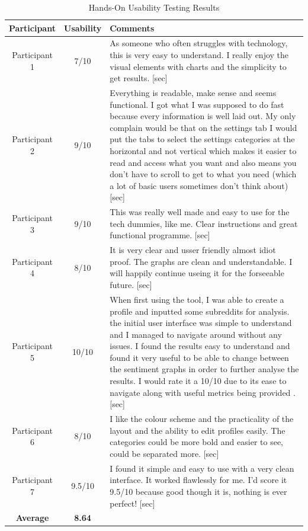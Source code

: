         \FloatBarrier
        \begin{table}[ht]
            \centering
            \caption{Hands-On Usability Testing Results}
            \label{tab:hands_on_usability_testing}
            \begin{tabular}{c|c|p{8cm}}
                \textbf{Participant} & \textbf{Usability} & \textbf{Comments} \\
                \hline\hline
                Participant 1 & 7/10 & As someone who often struggles with technology, this is very easy to understand. I really enjoy the visual elements with charts and the simplicity to get results. [sec] \\ \hline
                Participant 2 & 9/10 & Everything is readable, make sense and seems functional. I got what I was supposed to do fast because every information is well laid out. My only complain would be that on the settings tab I would put the tabs to select the settings categories at the horizontal and not vertical which makes it easier to read and access what you want and also means you don't have to scroll to get to what you need (which a lot of basic users sometimes don't think about) [sec] \\ \hline
                Participant 3 & 9/10 & This was really well made and easy to use for the tech dummies, like me. Clear instructions and great functional programme. [sec] \\ \hline
                Participant 4 & 8/10 & It is very clear and usser friendly almost idiot proof. The graphs are clean and understandable. I will happily continue useing it for the forseeable future. [sec] \\ \hline
                Participant 5 & 10/10 & When first using the tool, I was able to create a profile and inputted some subreddits for analysis. the initial user interface was simple to understand and I managed to navigate around without any issues. I found the results easy to understand and found it very useful to be able to change between the sentiment graphs in order to further analyse the results. I would rate it a 10/10 due to its ease to navigate along with useful metrics being provided . [sec] \\ \hline
                Participant 6 & 8/10 & I like the colour scheme and the practicality of the layout and the ability to edit profiles easily. The categories could be more bold and easier to see, could be separated more. [sec] \\ \hline
                Participant 7 & 9.5/10 & I found it simple and easy to use with a very clean interface. It worked flawlessly for me. I'd score it 9.5/10 because good though it is, nothing is ever perfect! [sec] \\
                \hline\hline
                \textbf{Average} & \textbf{8.64} & \\
            \end{tabular}
        \end{table}
        \FloatBarrier

